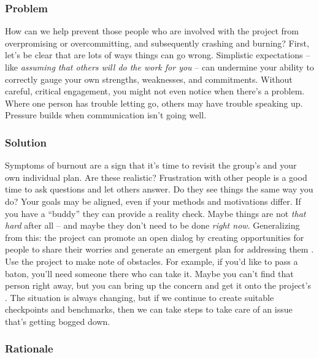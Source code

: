 \subsubsection*{Problem}

How can we help prevent those people who are involved with the project from overpromising or overcommitting, and subsequently crashing and burning?  First, let's be clear that are lots of ways things can go wrong.  Simplistic expectations -- like \emph{assuming that others will do the work for you} \cite{torvalds-interview} -- can undermine your ability to correctly gauge your own strengths, weaknesses, and commitments.  Without careful, critical engagement, you might not even notice when there's a problem.  Where one person has trouble letting go, others may have trouble speaking up.  Pressure builds when communication isn't going well.  

\subsubsection*{Solution}

Symptoms of burnout are a sign that it's time to revisit the group's  and your own individual plan.  Are these realistic?  Frustration with other people is a good time to ask questions and let others answer.  Do they see things the same way you do?  Your goals may be aligned, even if your methods and motivations differ. If you have a ``buddy'' they can provide a reality check.   Maybe things are not \emph{that hard} after all -- and maybe they don't need to be done \emph{right now}.  Generalizing from this: the project can promote an open dialog by creating opportunities for people to share their worries and generate an emergent plan for addressing them \cite{seikkula2006dialogical}.  Use the project  to make note of obstacles.  For example, if you'd like to pass a baton, you'll need someone there who can take it.  Maybe you can't find that person right away, but you can bring up the concern and get it onto the project's .  The situation is always changing, but if we continue to create suitable checkpoints and benchmarks, then we can take steps to take care of an issue that's getting bogged down.    

\subsubsection*{Rationale}

